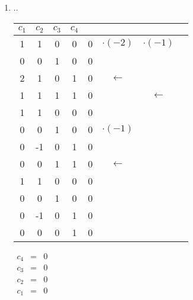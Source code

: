 \begin{enumerate}
				    \item ..
				  		
							\begin{tabular} {cccc|cccc}
								$c_1$ & $c_2$ & $c_3$ & $c_4$ & & &\\
								\hline
								1 & 1 & 0 & 0 & 0 & $\cdot(-2)$ & $\cdot(-1)$ & \\
								0 & 0 & 1 & 0 & 0 & & & \\
								2 & 1 & 0 & 1 & 0 & $\leftarrow$ & & \\
								1 & 1 & 1 & 1 & 0 & & $\leftarrow$ & \\
								\hline
								1 & 1 & 0 & 0 & 0 & & & \\
								0 & 0 & 1 & 0 & 0 & $\cdot(-1)$ & & \\
								0 & -1 & 0 & 1 & 0 & & & \\
								0 & 0 & 1 & 1 & 0 & $\leftarrow$ & & \\
								\hline
								1 & 1 & 0 & 0 & 0 & & & \\
								0 & 0 & 1 & 0 & 0 & & & \\
								0 & -1 & 0 & 1 & 0 & & & \\
								0 & 0 & 0 & 1 & 0 & & & \\
							\end{tabular}
						
						
						
							$\begin{array} {ccc}
								c_4 & = & 0\\
								c_3 & = & 0\\
								c_2 & = & 0\\
								c_1 & = & 0\\
							\end{array}$
								
				\end{enumerate}
				
